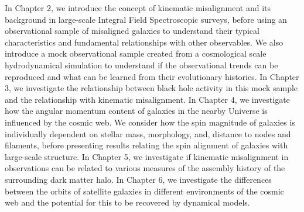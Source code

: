 In Chapter 2, we introduce the concept of kinematic misalignment and its background in large-scale Integral Field Spectroscopic surveys, before using an observational sample of misaligned galaxies to understand their typical characteristics and fundamental relationships with other observables. We also introduce a mock observational sample created from a cosmological scale hydrodynamical simulation to understand if the observational trends can be reproduced and what can be learned from their evolutionary histories. In Chapter 3, we investigate the relationship between black hole activity in this mock sample and the relationship with kinematic misalignment. In Chapter 4, we investigate how the angular momentum content of galaxies in the nearby Universe is influenced by the cosmic web. We consider how the spin magnitude of galaxies is individually dependent on stellar mass, morphology, and, distance to nodes and filaments, before presenting results relating the spin alignment of galaxies with large-scale structure. In Chapter 5, we investigate if kinematic misalignment in observations can be related to various measures of the assembly history of the surrounding dark matter halo. In Chapter 6, we investigate the differences between the orbits of satellite galaxies in different environments of the cosmic web and the potential for this to be recovered by dynamical models.